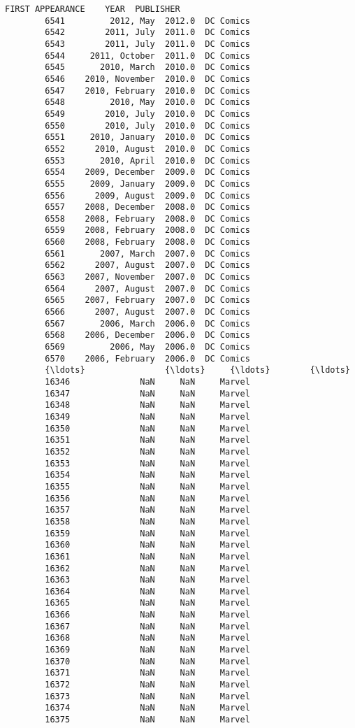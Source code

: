\documentclass[11pt]{article}
\begin{document}
\begin{Verbatim}[commandchars=\\\{\}]
              FIRST APPEARANCE    YEAR  PUBLISHER  
        6541         2012, May  2012.0  DC Comics  
        6542        2011, July  2011.0  DC Comics  
        6543        2011, July  2011.0  DC Comics  
        6544     2011, October  2011.0  DC Comics  
        6545       2010, March  2010.0  DC Comics  
        6546    2010, November  2010.0  DC Comics  
        6547    2010, February  2010.0  DC Comics  
        6548         2010, May  2010.0  DC Comics  
        6549        2010, July  2010.0  DC Comics  
        6550        2010, July  2010.0  DC Comics  
        6551     2010, January  2010.0  DC Comics  
        6552      2010, August  2010.0  DC Comics  
        6553       2010, April  2010.0  DC Comics  
        6554    2009, December  2009.0  DC Comics  
        6555     2009, January  2009.0  DC Comics  
        6556      2009, August  2009.0  DC Comics  
        6557    2008, December  2008.0  DC Comics  
        6558    2008, February  2008.0  DC Comics  
        6559    2008, February  2008.0  DC Comics  
        6560    2008, February  2008.0  DC Comics  
        6561       2007, March  2007.0  DC Comics  
        6562      2007, August  2007.0  DC Comics  
        6563    2007, November  2007.0  DC Comics  
        6564      2007, August  2007.0  DC Comics  
        6565    2007, February  2007.0  DC Comics  
        6566      2007, August  2007.0  DC Comics  
        6567       2006, March  2006.0  DC Comics  
        6568    2006, December  2006.0  DC Comics  
        6569         2006, May  2006.0  DC Comics  
        6570    2006, February  2006.0  DC Comics  
        {\ldots}                {\ldots}     {\ldots}        {\ldots}  
        16346              NaN     NaN     Marvel  
        16347              NaN     NaN     Marvel  
        16348              NaN     NaN     Marvel  
        16349              NaN     NaN     Marvel  
        16350              NaN     NaN     Marvel  
        16351              NaN     NaN     Marvel  
        16352              NaN     NaN     Marvel  
        16353              NaN     NaN     Marvel  
        16354              NaN     NaN     Marvel  
        16355              NaN     NaN     Marvel  
        16356              NaN     NaN     Marvel  
        16357              NaN     NaN     Marvel  
        16358              NaN     NaN     Marvel  
        16359              NaN     NaN     Marvel  
        16360              NaN     NaN     Marvel  
        16361              NaN     NaN     Marvel  
        16362              NaN     NaN     Marvel  
        16363              NaN     NaN     Marvel  
        16364              NaN     NaN     Marvel  
        16365              NaN     NaN     Marvel  
        16366              NaN     NaN     Marvel  
        16367              NaN     NaN     Marvel  
        16368              NaN     NaN     Marvel  
        16369              NaN     NaN     Marvel  
        16370              NaN     NaN     Marvel  
        16371              NaN     NaN     Marvel  
        16372              NaN     NaN     Marvel  
        16373              NaN     NaN     Marvel  
        16374              NaN     NaN     Marvel  
        16375              NaN     NaN     Marvel  
        

\end{Verbatim}
\end{document}
